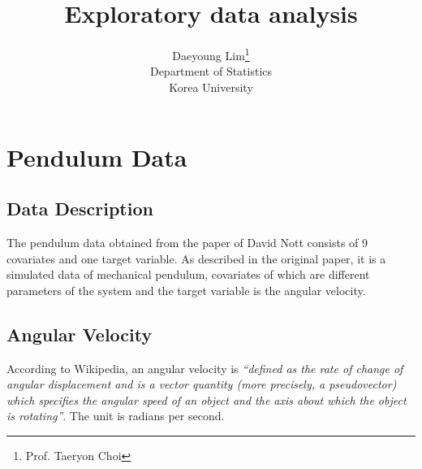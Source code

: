 \documentclass[11pt]{article}
\begin{document}
\nocite{*}

\title{Exploratory data analysis}

\author{Daeyoung Lim\thanks{Prof. Taeryon Choi} \\
Department of Statistics \\
Korea University}

\maketitle
\section{Pendulum Data}
\subsection{Data Description}
The pendulum data obtained from the paper of David Nott consists of 9 covariates and one target variable. As described in the original paper, it is a simulated data of mechanical pendulum, covariates of which are different parameters of the system and the target variable is the angular velocity.
\subsection{Angular Velocity}
According to Wikipedia, an angular velocity is \textit{``defined as the rate of change of angular displacement and is a vector quantity (more precisely, a pseudovector) which specifies the angular speed of an object and the axis about which the object is rotating''}. The unit is radians per second.
\end{document}
